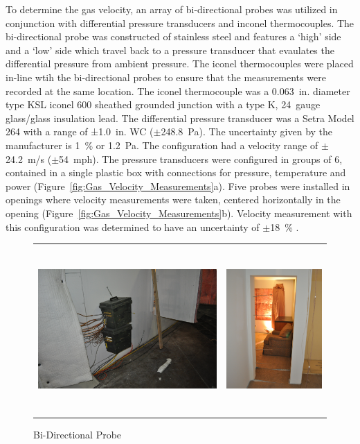 \documentclass[12pt,oneside]{book}
\begin{document}
To determine the gas velocity, an array of bi-directional probes was utilized in conjunction with differential pressure transducers and inconel thermocouples. The bi-directional probe was constructed of stainless steel and features a `high' side and a `low' side which travel back to a pressure transducer that evaulates the differential pressure from ambient pressure. The iconel thermocouples were placed in-line wtih the bi-directional probes to ensure that the measurements were recorded at the same location. The iconel thermocouple was a 0.063~in. diameter type KSL iconel 600 sheathed grounded junction with a type K, 24~gauge glass/glass insulation lead. The differential pressure transducer was a Setra Model 264 with a range of ±1.0~in. WC ($\pm$248.8~Pa). The uncertainty given by the manufacturer is 1~\% or 1.2~Pa. The configuration had a velocity range of $\pm$24.2~m/s ($\pm$54~mph). The pressure transducers were configured in groups of 6, contained in a single plastic box with connections for pressure, temperature and power (Figure~\ref{fig:Gas_Velocity_Measurements}a). Five probes were installed in openings where velocity measurements were taken, centered horizontally in the opening (Figure~\ref{fig:Gas_Velocity_Measurements}b). Velocity measurement with this configuration was determined to have an uncertainty of $\pm$18~\% \cite{BDPInPoolFires}.

\begin{figure}[H]
	\centering
	\begin{tabular}{c c}
		\includegraphics[height = 2.5in]{0_Images/Instrumentation/PressureBox.jpg} &
		\includegraphics[height = 2.5in]{0_Images/Instrumentation/BDPArray.jpg} \\
	\end{tabular}
	\caption{Bi-Directional Probe}
	\label{fig:BDP}
\end{figure}
\end{document}

